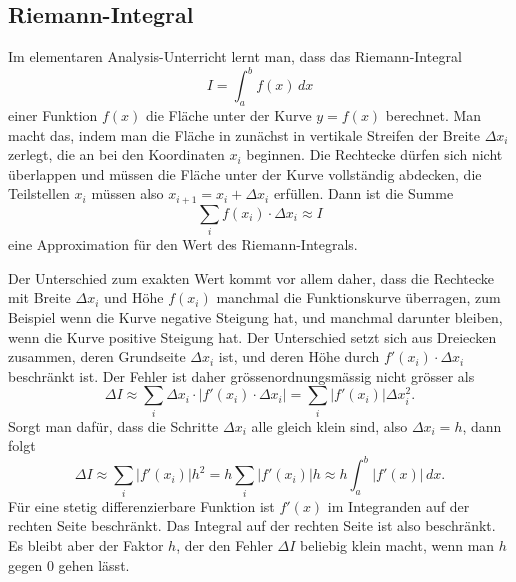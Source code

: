 %
%
\subsection{Riemann-Integral}
Im elementaren Analysis-Unterricht lernt man, dass das Riemann-Integral
\[
I
=
\int_a^b f(x)\,dx
\]
einer Funktion $f(x)$ die Fläche unter der Kurve $y=f(x)$ berechnet.
Man macht das, indem man die Fläche in zunächst in vertikale Streifen
der Breite $\Delta x_i$ zerlegt, die an bei den Koordinaten $x_i$
beginnen.
Die Rechtecke dürfen sich nicht überlappen und müssen die Fläche unter
der Kurve vollständig abdecken, die Teilstellen $x_i$ müssen
also $x_{i+1}=x_i+\Delta x_i$ erfüllen.
Dann ist die Summe
\begin{equation}
\sum_{i} f(x_i)\cdot \Delta x_i
\approx 
I
\label{buch:kurvenintegral:1-form:eqn:riemann-summe}
\end{equation}
eine Approximation für den Wert des Riemann-Integrals.

Der Unterschied zum exakten Wert kommt vor allem daher, dass die
Rechtecke mit Breite $\Delta x_i$ und Höhe $f(x_i)$ manchmal
die Funktionskurve überragen, zum Beispiel wenn die Kurve negative
Steigung hat, und manchmal darunter bleiben, wenn die Kurve positive
Steigung hat.
Der Unterschied setzt sich aus Dreiecken zusammen, deren Grundseite
$\Delta x_i$ ist, und deren Höhe durch $f'(x_i)\cdot \Delta x_i$
beschränkt ist.
Der Fehler ist daher grössenordnungsmässig nicht grösser als
\[
\Delta I
\approx
\sum_i \Delta x_i \cdot |f'(x_i)\cdot \Delta x_i|
=
\sum_i |f'(x_i)| \Delta x_i^2.
\]
Sorgt man dafür, dass die Schritte $\Delta x_i$ alle gleich klein
sind, also $\Delta x_i=h$, dann folgt
\[
\Delta I
\approx
\sum_i |f'(x_i)| h^2
=
h\sum_i |f'(x_i)|h
\approx
h\int_a^b |f'(x)|\,dx.
\]
Für eine stetig differenzierbare Funktion ist $f'(x)$ im Integranden
auf der rechten Seite beschränkt.
Das Integral auf der rechten Seite ist also beschränkt.
Es bleibt aber der Faktor $h$, der den Fehler $\Delta I$ beliebig
klein macht, wenn man $h$ gegen $0$ gehen lässt.

%
%
